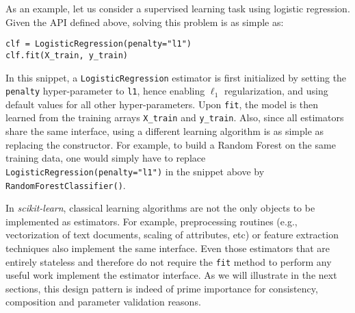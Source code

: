 \documentclass{llncs}
\begin{document}

As an example, let us consider a supervised learning task using logistic regression.
Given the API defined above, solving this problem is as simple as:
\begin{verbatim}
clf = LogisticRegression(penalty="l1")
clf.fit(X_train, y_train)
\end{verbatim}
In this snippet, a \texttt{LogisticRegression} estimator is first initialized by
setting the \texttt{penalty} hyper-parameter to \texttt{l1}, hence
enabling $\ell_1$
regularization, and using default values for all other hyper-parameters. Upon
\texttt{fit}, the model is then learned from the training arrays \texttt{X\_train} and
\texttt{y\_train}. Also, since all estimators share the same interface, using a
different learning algorithm is as simple as replacing the constructor. For
example, to build a Random Forest on the same training data, one would simply
have to replace \texttt{LogisticRegression(penalty="l1")} in the snippet above by
\texttt{RandomForestClassifier()}. 

In \textit{scikit-learn}, classical learning algorithms are not the only objects
to be implemented as estimators. For example, preprocessing routines (e.g.,
vectorization of text documents, scaling of attributes, etc) or feature
extraction techniques also implement the same interface. Even those estimators
that are entirely stateless and therefore do not require the \texttt{fit} method
to perform any useful work implement the estimator interface. As we will
illustrate in the next sections, this design pattern is indeed of prime
importance for consistency, composition and parameter validation reasons.
\end{document}
